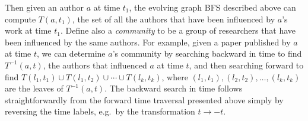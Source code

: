 \documentclass[10pt,conference,compsocconf]{IEEEtran}
\theoremstyle{definition}
\begin{document}
Then given an author $a$ at time $t_1$, the evolving graph BFS described above
can compute $T(a, t_1)$, the set of all the authors that have been influenced by
$a$'s work at time $t_1$.
Define also a \emph{community} to be a group of
researchers that have been influenced by the same authors.
For example, given a paper published by $a$ at time $t$,
we can determine $a$'s community by searching backward in time to find
$T^{-1}(a, t)$, the authors that influenced $a$ at time $t$, and then searching
forward to find $T(l_1, t_1) \cup T(l_1, t_2) \cup \cdots \cup T(l_k, t_k)$, where
$(l_1,t_1), (l_2, t_2), \ldots, (l_k, t_k)$ are the leaves of $T^{-1}(a,t)$.
The backward search in time follows straightforwardly from the forward time traversal
presented above simply by reversing the time labels, e.g.\ by the transformation
$t\rightarrow -t$.

\end{document}
